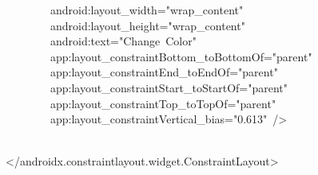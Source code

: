 {\ttfamily\small \ \ \ \ \ \ \ \ android:layout\_width="wrap\_content"} \\
{\ttfamily\small \ \ \ \ \ \ \ \ android:layout\_height="wrap\_content"} \\
{\ttfamily\small \ \ \ \ \ \ \ \ android:text="Change\ Color"} \\
{\ttfamily\small \ \ \ \ \ \ \ \ app:layout\_constraintBottom\_toBottomOf="parent"} \\
{\ttfamily\small \ \ \ \ \ \ \ \ app:layout\_constraintEnd\_toEndOf="parent"} \\
{\ttfamily\small \ \ \ \ \ \ \ \ app:layout\_constraintStart\_toStartOf="parent"} \\
{\ttfamily\small \ \ \ \ \ \ \ \ app:layout\_constraintTop\_toTopOf="parent"} \\
{\ttfamily\small \ \ \ \ \ \ \ \ app:layout\_constraintVertical\_bias="0.613"\ /\textgreater{}} \\
\strut \\
{\ttfamily\small \textless{}/androidx.constraintlayout.widget.ConstraintLayout\textgreater{}} \\
